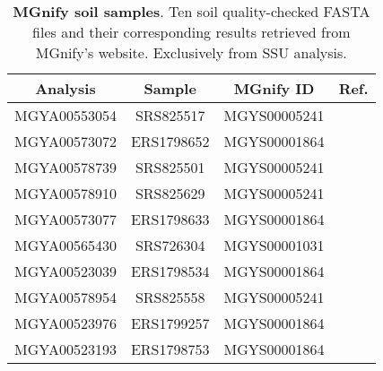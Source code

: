 \begin{table}[H]
    \centering
    \begin{tabular}{|c |c| c |c|} 
 \hline
 Analysis & Sample & MGnify ID & Ref. \\ [0.5ex] 
 \hline\hline
 MGYA00553054 & SRS825517 & MGYS00005241 & ~\cite{noauthor_mgnify_nodate-9} \\ 
 \hline
 MGYA00573072 & ERS1798652 & MGYS00001864 & ~\cite{noauthor_mgnify_nodate-8} \\
 \hline
 MGYA00578739 & SRS825501 & MGYS00005241 & ~\cite{noauthor_mgnify_nodate-7} \\
 \hline
 MGYA00578910 & SRS825629 & MGYS00005241 & ~\cite{noauthor_mgnify_nodate-6} \\
 \hline
 MGYA00573077 & ERS1798633 & MGYS00001864 & ~\cite{noauthor_mgnify_nodate-5} \\ 
 \hline
 MGYA00565430 & SRS726304 & MGYS00001031 & ~\cite{noauthor_mgnify_nodate-4} \\
 \hline
 MGYA00523039 & ERS1798534 & MGYS00001864 & ~\cite{noauthor_mgnify_nodate-3} \\
 \hline
 MGYA00578954 & SRS825558 & MGYS00005241 & ~\cite{noauthor_mgnify_nodate-2} \\
 \hline
 MGYA00523976 & ERS1799257 & MGYS00001864 & ~\cite{noauthor_mgnify_nodate-1} \\
 \hline
 MGYA00523193 & ERS1798753 & MGYS00001864 & ~\cite{noauthor_mgnify_nodate} \\ [1ex]
 \hline
\end{tabular}
    \caption[MGnify soil samples]{\textbf{MGnify soil samples}. Ten soil quality-checked FASTA files and their corresponding results retrieved from MGnify's website. Exclusively from SSU analysis.}
    \label{tab:soil-samples}
\end{table}

\par
